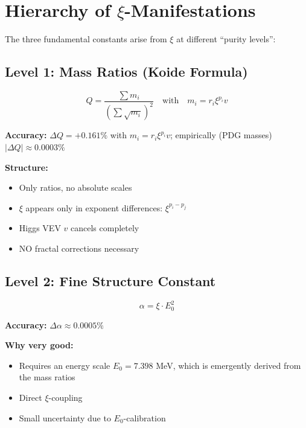 	
	\section{Hierarchy of $\xi$-Manifestations}
	
	The three fundamental constants arise from $\xi$ at different ``purity levels'':
	
	\subsection{Level 1: Mass Ratios (Koide Formula)}
	
	\begin{equation}
		Q = \frac{\sum m_i}{\left(\sum \sqrt{m_i}\right)^2} \quad \text{with} \quad m_i = r_i \xi^{p_i} v
	\end{equation}
	
	\begin{tcolorbox}[colback=green!5!white,colframe=green!75!black,title={Purest $\xi$-Form}]
		\textbf{Accuracy:} $\Delta Q = +0.161\%$ with $m_i = r_i \xi^{p_i} v$; empirically (PDG masses) $|\Delta Q| \approx 0.0003\%$
		
		\textbf{Structure:}
		\begin{itemize}
			\item Only ratios, no absolute scales
			\item $\xi$ appears only in exponent differences: $\xi^{p_i - p_j}$
			\item Higgs VEV $v$ cancels completely
			\item NO fractal corrections necessary
		\end{itemize}
	\end{tcolorbox}
	
	\subsection{Level 2: Fine Structure Constant}
	
	\begin{equation}
		\alpha = \xi \cdot E_0^2
	\end{equation}
	
	\begin{tcolorbox}[colback=blue!5!white,colframe=blue!75!black,title={Semi-pure $\xi$-Form}]
		\textbf{Accuracy:} $\Delta \alpha \approx 0.0005\%$
		
		\textbf{Why very good:}
		\begin{itemize}
			\item Requires an energy scale $E_0 = 7.398$ MeV, which is emergently derived from the mass ratios
			\item Direct $\xi$-coupling
			\item Small uncertainty due to $E_0$-calibration
		\end{itemize}
	\end{tcolorbox}
	
